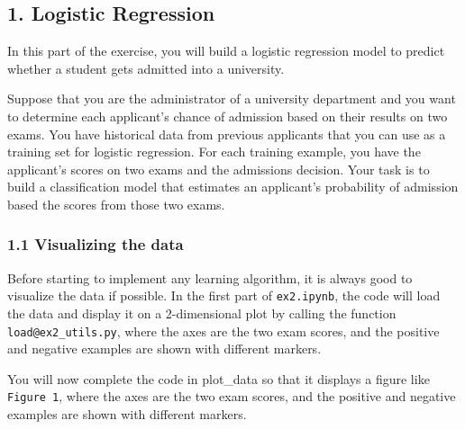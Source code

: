 \documentclass[11pt]{article}
\begin{document}
    \subsection{1. Logistic Regression}\label{logistic-regression}

In this part of the exercise, you will build a logistic regression model
to predict whether a student gets admitted into a university.

Suppose that you are the administrator of a university department and
you want to determine each applicant's chance of admission based on
their results on two exams. You have historical data from previous
applicants that you can use as a training set for logistic regression.
For each training example, you have the applicant's scores on two exams
and the admissions decision. Your task is to build a classification
model that estimates an applicant's probability of admission based the
scores from those two exams.

\subsubsection{1.1 Visualizing the data}\label{visualizing-the-data}

Before starting to implement any learning algorithm, it is always good
to visualize the data if possible. In the first part of
\texttt{ex2.ipynb}, the code will load the data and display it on a
2-dimensional plot by calling the function \texttt{load@ex2\_utils.py},
where the axes are the two exam scores, and the positive and negative
examples are shown with different markers.

You will now complete the code in plot\_data so that it displays a
figure like \texttt{Figure\ 1}, where the axes are the two exam scores,
and the positive and negative examples are shown with different markers.
\end{document}
